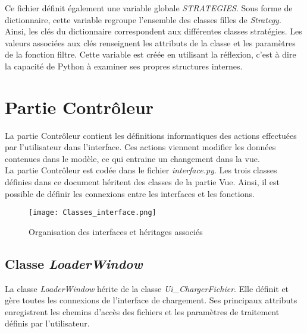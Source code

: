 Ce fichier définit également une variable globale \textit{STRATEGIES}. Sous forme de dictionnaire, cette variable regroupe l'ensemble des classes filles de \textit{Strategy}. Ainsi, les clés du dictionnaire correspondent aux différentes classes stratégies. Les valeurs associées aux clés renseignent les attributs de la classe et les paramètres de la fonction filtre. Cette variable est créée en utilisant la réflexion, c'est à dire la capacité de Python à examiner ses propres structures internes. 

\section{Partie Contrôleur}

La partie Contrôleur contient les définitions informatiques des actions effectuées par l'utilisateur dans l'interface. Ces actions viennent modifier les données contenues dans le modèle, ce qui entraine un changement dans la vue.\\

La partie Contrôleur est codée dans le fichier \textit{interface.py}. Les trois classes définies dans ce document héritent des classes de la partie Vue. Ainsi, il est possible de définir les connexions entre les interfaces et les fonctions.

\begin{figure}[H]
	\centering
	\texttt{[image: Classes\_interface.png]}  \\
	\caption[Organisation des interfaces et héritages associés]{Organisation des interfaces et héritages associés}
	\label{fig:classesinterf}
\end{figure}

\subsection{Classe \textit{LoaderWindow}}

La classe \textit{LoaderWindow} hérite de la classe \textit{Ui\_ChargerFichier}. Elle définit et gère toutes les connexions de l'interface de chargement. Ses principaux attributs enregistrent les chemins d'accès des fichiers et les paramètres de traitement définis par l'utilisateur.\\

